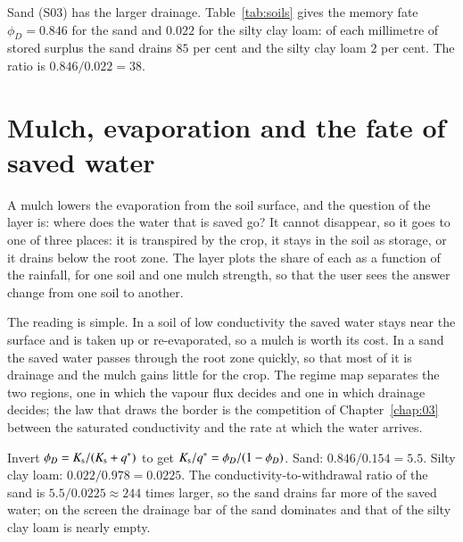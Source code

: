 \sol  Sand (S03) has the larger drainage. Table~\ref{tab:soils} gives the memory fate $\phi_D=0.846$ for the sand and $0.022$ for the silty clay loam: of each millimetre of stored surplus the sand drains $85$ per cent and the silty clay loam $2$ per cent. The ratio is $0.846/0.022=38$. \finans


\section{Mulch, evaporation and the fate of saved water}
A mulch lowers the evaporation from the soil surface, and the question of the layer is: where does the water that is saved go? It cannot disappear, so it goes to one of three places: it is transpired by the crop, it stays in the soil as storage, or it drains below the root zone. The layer plots the share of each as a function of the rainfall, for one soil and one mulch strength, so that the user sees the answer change from one soil to another.

The reading is simple. In a soil of low conductivity the saved water stays near the surface and is taken up or re-evaporated, so a mulch is worth its cost. In a sand the saved water passes through the root zone quickly, so that most of it is drainage and the mulch gains little for the crop. The regime map separates the two regions, one in which the vapour flux decides and one in which drainage decides; the law that draws the border is the competition of Chapter~\ref{chap:03} between the saturated conductivity and the rate at which the water arrives.

\sol  Invert $\phi_D=K_{\mathrm s}/(K_{\mathrm s}+q^*)$ to get $K_{\mathrm s}/q^*=\phi_D/(1-\phi_D)$. Sand: $0.846/0.154=5.5$. Silty clay loam: $0.022/0.978=0.0225$. The conductivity-to-withdrawal ratio of the sand is $5.5/0.0225\approx 244$ times larger, so the sand drains far more of the saved water; on the screen the drainage bar of the sand dominates and that of the silty clay loam is nearly empty. \finans


